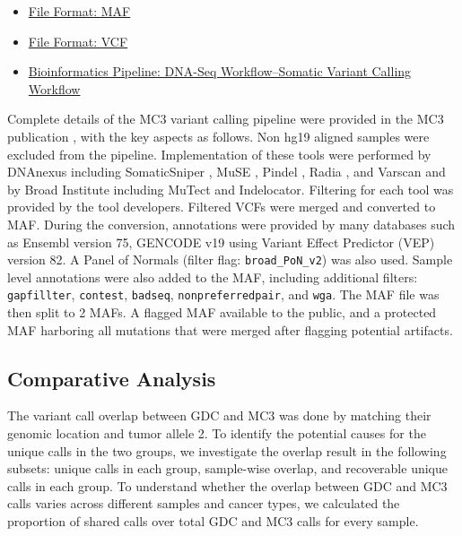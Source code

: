 \tightlists
\begin{itemize}
    \tightlist
    \item \href{https://docs.gdc.cancer.gov/Data/File_Formats/MAF_Format/}{File Format: MAF}
    \item \href{https://docs.gdc.cancer.gov/Data/File_Formats/VCF_Format/}{File Format: VCF}
    \item \href{https://docs.gdc.cancer.gov/Data/Bioinformatics_Pipelines/DNA_Seq_Variant_Calling_Pipeline/#somatic-variant-calling-workflow}{Bioinformatics Pipeline: DNA-Seq Workflow--Somatic Variant Calling Workflow}
\end{itemize}

Complete details of the MC3 variant calling pipeline were provided in the MC3 publication \cite{ellrottk_tcga:MC3MutationCalling2018}, with the key aspects as follows. Non hg19 aligned samples were excluded from the pipeline. Implementation of these tools were performed by DNAnexus including SomaticSniper \cite{larsonde_dingl:SomaticSniper2012}, MuSE \cite{fany_wangw:MuSE2016}, Pindel \cite{yek_ningz:Pindel2009}, Radia \cite{radenbaughaj_hausslerd:RADIA2014}, and Varscan \cite{koboldtdc_wilsonrk:VarScan22012} and by Broad Institute including MuTect \cite{cibulskisk_getzg:SensitiveDetection2013} and Indelocator. Filtering for each tool was provided by the tool developers. Filtered VCFs were merged and converted to MAF. During the conversion, annotations were provided by many databases such as Ensembl version 75, GENCODE v19 using Variant Effect Predictor (VEP) version 82. A Panel of Normals (filter flag: \texttt{broad\_PoN\_v2}) was also used. Sample level annotations were also added to the MAF, including additional filters: \texttt{gapfillter}, \texttt{contest}, \texttt{badseq}, \texttt{nonpreferredpair}, and \texttt{wga}. The MAF file was then split to 2 MAFs. A flagged MAF available to the public, and a protected MAF harboring all mutations that were merged after flagging potential artifacts.

\subsection{Comparative Analysis}
The variant call overlap between GDC and MC3 was done by matching their genomic location and tumor allele 2. To identify the potential causes for the unique calls in the two groups, we investigate the overlap result in the following subsets: unique calls in each group, sample-wise overlap, and recoverable unique calls in each group. To understand whether the overlap between GDC and MC3 calls varies across different samples and cancer types, we calculated the proportion of shared calls over total GDC and MC3 calls for every sample.


